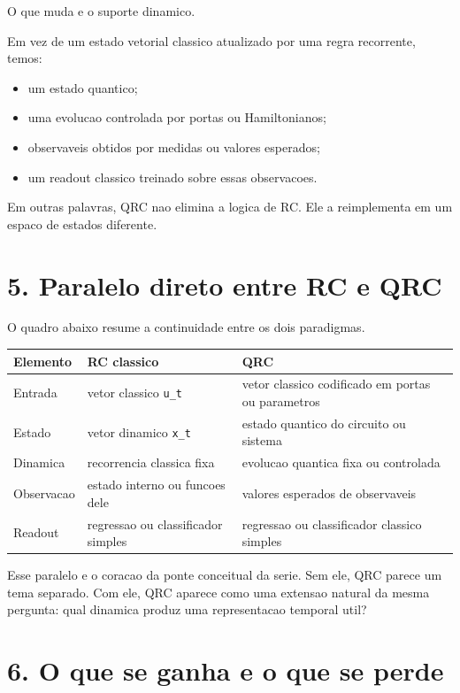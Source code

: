 \documentclass[12pt]{article}
\providecommand{\tightlist}{%
  \setlength{\itemsep}{0pt}\setlength{\parskip}{0pt}}
\begin{document}
O que muda e o suporte dinamico.

Em vez de um estado vetorial classico atualizado por uma regra recorrente, temos:

\begin{itemize}
\tightlist
\item
  um estado quantico;
\item
  uma evolucao controlada por portas ou Hamiltonianos;
\item
  observaveis obtidos por medidas ou valores esperados;
\item
  um readout classico treinado sobre essas observacoes.
\end{itemize}

Em outras palavras, QRC nao elimina a logica de RC. Ele a reimplementa em um espaco de estados diferente.

\section{5. Paralelo direto entre RC e QRC}\label{5-paralelo-direto-entre-rc-e-qrc}

O quadro abaixo resume a continuidade entre os dois paradigmas.

\begin{longtable}[]{@{}lll@{}}
\toprule\noalign{}
Elemento & RC classico & QRC \\
\midrule\noalign{}
\endhead
\bottomrule\noalign{}
\endlastfoot
Entrada & vetor classico \texttt{u\_t} & vetor classico codificado em portas ou parametros \\
Estado & vetor dinamico \texttt{x\_t} & estado quantico do circuito ou sistema \\
Dinamica & recorrencia classica fixa & evolucao quantica fixa ou controlada \\
Observacao & estado interno ou funcoes dele & valores esperados de observaveis \\
Readout & regressao ou classificador simples & regressao ou classificador classico simples \\
\end{longtable}

Esse paralelo e o coracao da ponte conceitual da serie. Sem ele, QRC parece um tema separado. Com ele, QRC aparece como uma extensao natural da mesma pergunta: qual dinamica produz uma representacao temporal util?

\section{6. O que se ganha e o que se perde}\label{6-o-que-se-ganha-e-o-que-se-perde}
\end{document}

